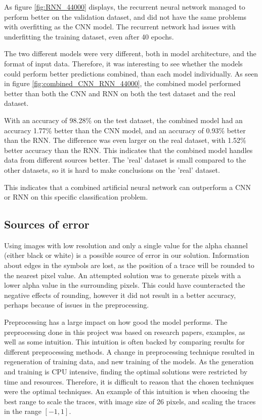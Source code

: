 As figure \ref{fig:RNN_44000} displays, the recurrent neural network managed to perform better on the validation dataset, and did not have the same problems with overfitting as the CNN model. The recurrent network had issues with underfitting the training dataset, even after 40 epochs. 

The two different models were very different, both in model architecture, and the format of input data. Therefore, it was interesting to see whether the models could perform better predictions combined, than each model individually. As seen in figure \ref{fig:combined_CNN_RNN_44000}, the combined model performed better than both the CNN and RNN on both the test dataset and the real dataset. 

With an accuracy of 98.28\% on the test dataset, the combined model had an accuracy 1.77\% better than the CNN model, and an accuracy of 0.93\% better than the RNN. The difference was even larger on the real dataset, with 1.52\% better accuracy than the RNN. This indicates that the combined model handles data from different sources better. The 'real' dataset is small compared to the other datasets, so it is hard to make conclusions on the 'real' dataset. 

This indicates that a combined artificial neural network can outperform a CNN or RNN on this specific classification problem.

\subsection{Sources of error}

Using images with low resolution and only a single value for the alpha channel (either black or white) is a possible source of error in our solution. Information about edges in the symbols are lost, as the position of a trace will be rounded to the nearest pixel value. An attempted solution was to generate pixels with a lower alpha value in the surrounding pixels. This could have counteracted the negative effects of rounding, however it did not result in a better accuracy, perhaps because of issues in the preprocessing.

Preprocessing has a large impact on how good the model performs. The preprocessing done in this project was based on research papers, examples, as well as some intuition. This intuition is often backed by comparing results for different preprocessing methods. A change in preprocessing technique resulted in regeneration of training data, and new training of the models. As the generation and training is CPU intensive, finding the optimal solutions were restricted by time and resources. Therefore, it is difficult to reason that the chosen techniques were the optimal techniques. An example of this intuition is when choosing the best range to scale the traces, with image size of 26 pixels, and scaling the traces in the range $[-1, 1]$. 

